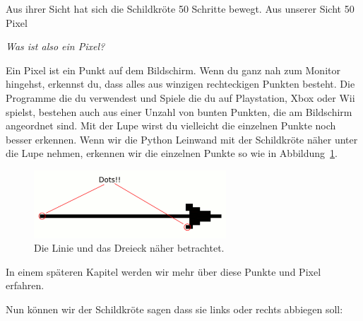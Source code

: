 Aus ihrer Sicht hat sich die Schildkröte 50 Schritte bewegt. Aus unserer Sicht 50 Pixel

\noindent
\emph{Was ist also ein Pixel?}

Ein Pixel ist ein Punkt auf dem Bildschirm. Wenn du ganz nah zum Monitor hingehst, erkennst du, dass alles aus winzigen rechteckigen Punkten besteht. Die Programme die du verwendest und Spiele die du auf Playstation, Xbox oder Wii spielst, bestehen auch aus einer Unzahl von bunten Punkten, die am Bildschirm angeordnet sind. Mit der Lupe wirst du vielleicht die einzelnen Punkte noch besser erkennen. Wenn wir die Python Leinwand mit der Schildkröte näher unter die Lupe nehmen, erkennen wir die einzelnen Punkte so wie in Abbildung~\ref{fig12}.

\begin{figure}
\begin{center}
\includegraphics[width=72mm]{images/figure12}
\end{center}
\caption{Die Linie und das Dreieck näher betrachtet.}\label{fig12}
\end{figure}

In einem späteren Kapitel werden wir mehr über diese Punkte und Pixel erfahren.

Nun können wir der Schildkröte sagen dass sie links oder rechts  abbiegen soll:

